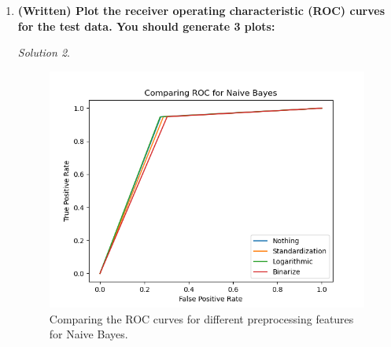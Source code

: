 \documentclass[a4paper,12pt]{article}
\theoremstyle{definition}
\theoremstyle{remark}
\newtheorem*{solution}{Solution}
\begin{document}
\begin{enumerate}
\begin{enumerate}
\begin{solution}
\begin{figure}[h]
					\caption{Comparing the different preprocessing methods for Logistic Regression on the Spam Classification task. Bolded means the result is the highest of all methods in that metric.}
					\label{tab:lrresults}
				\end{figure}
				Additionally, it is noted that the do nothing preconditioning method resulted in a `did not converge' error using LBFGS up to 5000 iterations, so it was rerun with Newton-CSG as the iterative solver, where there was convergence for all of the preprocessing steps. While the exact accuracies are slightly different, they are the same as the LBFGS method for up to 4 decimal places, and the overall trends of logarithmic preprocessing still reigns supreme. 
				Lastly, it is imperative to note that Logistic Regression did between 10 and 15 \% better than Naive Bayes for the same data set.
				\end{solution}
			\item {\bf(Written) Plot the receiver operating characteristic (ROC) curves for the test data. You should generate 3 plots:}
			\begin{solution}
				\begin{figure}
					\centering
					\includegraphics[width=0.7\linewidth]{../nb}
					\caption{Comparing the ROC curves for different preprocessing features for Naive Bayes.}
					\label{fig:nb}
				\end{figure}
		

\end{solution}
\end{enumerate}
\end{enumerate}
\end{document}

